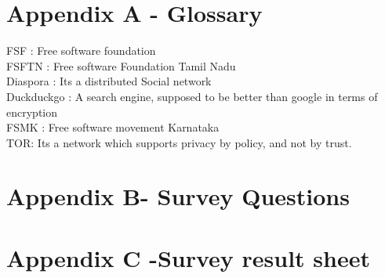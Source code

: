\documentclass[11pt]{book}
\begin{document}
\chapter{Appendix A - Glossary}
FSF : Free software foundation\\
FSFTN : Free software Foundation Tamil Nadu\\
Diaspora : Its a distributed Social network\\
Duckduckgo : A search engine, supposed to be better than google in terms of encryption\\
FSMK : Free software movement Karnataka\\
TOR: Its a network which supports privacy by policy, and not by trust.\\

\newpage
\chapter{Appendix B- Survey Questions}
\newpage
\chapter{Appendix C -Survey result sheet}
\newpage
\renewcommand{\cftchapdotsep}{\cftdotsep}
\end{document}
